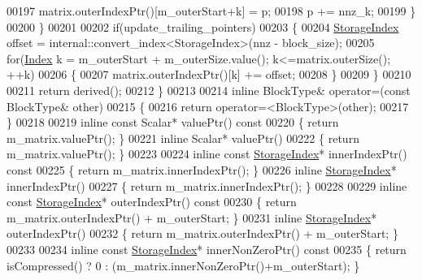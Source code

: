 \begin{DoxyCode}
00197           matrix.outerIndexPtr()[m\_outerStart+k] = p;
00198           p += nnz\_k;
00199         \}
00200       \}
00201 
00202       \textcolor{keywordflow}{if}(update\_trailing\_pointers)
00203       \{
00204         \hyperlink{group___sparse_core___module_a0b540ba724726ebe953f8c0df06081ed}{StorageIndex} offset = internal::convert\_index<StorageIndex>(nnz - block\_size);
00205         \textcolor{keywordflow}{for}(\hyperlink{group___core___module_a554f30542cc2316add4b1ea0a492ff02}{Index} k = m\_outerStart + m\_outerSize.value(); k<=matrix.outerSize(); ++k)
00206         \{
00207           matrix.outerIndexPtr()[k] += offset;
00208         \}
00209       \}
00210 
00211       \textcolor{keywordflow}{return} derived();
00212     \}
00213 
00214     \textcolor{keyword}{inline} BlockType& operator=(\textcolor{keyword}{const} BlockType& other)
00215     \{
00216       \textcolor{keywordflow}{return} \textcolor{keyword}{operator}=<BlockType>(other);
00217     \}
00218 
00219     \textcolor{keyword}{inline} \textcolor{keyword}{const} Scalar* valuePtr()\textcolor{keyword}{ const}
00220 \textcolor{keyword}{    }\{ \textcolor{keywordflow}{return} m\_matrix.valuePtr(); \}
00221     \textcolor{keyword}{inline} Scalar* valuePtr()
00222     \{ \textcolor{keywordflow}{return} m\_matrix.valuePtr(); \}
00223 
00224     \textcolor{keyword}{inline} \textcolor{keyword}{const} \hyperlink{group___sparse_core___module_a0b540ba724726ebe953f8c0df06081ed}{StorageIndex}* innerIndexPtr()\textcolor{keyword}{ const}
00225 \textcolor{keyword}{    }\{ \textcolor{keywordflow}{return} m\_matrix.innerIndexPtr(); \}
00226     \textcolor{keyword}{inline} \hyperlink{group___sparse_core___module_a0b540ba724726ebe953f8c0df06081ed}{StorageIndex}* innerIndexPtr()
00227     \{ \textcolor{keywordflow}{return} m\_matrix.innerIndexPtr(); \}
00228 
00229     \textcolor{keyword}{inline} \textcolor{keyword}{const} \hyperlink{group___sparse_core___module_a0b540ba724726ebe953f8c0df06081ed}{StorageIndex}* outerIndexPtr()\textcolor{keyword}{ const}
00230 \textcolor{keyword}{    }\{ \textcolor{keywordflow}{return} m\_matrix.outerIndexPtr() + m\_outerStart; \}
00231     \textcolor{keyword}{inline} \hyperlink{group___sparse_core___module_a0b540ba724726ebe953f8c0df06081ed}{StorageIndex}* outerIndexPtr()
00232     \{ \textcolor{keywordflow}{return} m\_matrix.outerIndexPtr() + m\_outerStart; \}
00233 
00234     \textcolor{keyword}{inline} \textcolor{keyword}{const} \hyperlink{group___sparse_core___module_a0b540ba724726ebe953f8c0df06081ed}{StorageIndex}* innerNonZeroPtr()\textcolor{keyword}{ const}
00235 \textcolor{keyword}{    }\{ \textcolor{keywordflow}{return} isCompressed() ? 0 : (m\_matrix.innerNonZeroPtr()+m\_outerStart); \}

\end{DoxyCode}
